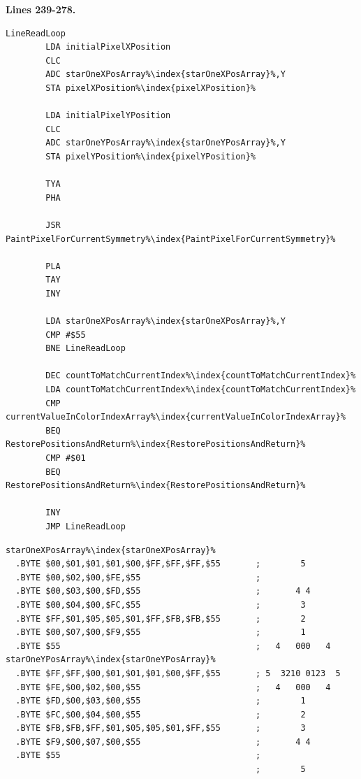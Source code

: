 \clearpage
\textbf{Lines 239-278. }
\begin{lstlisting}[caption=The core pattern-painting loop.,escapechar=\%]
LineReadLoop   
        LDA initialPixelXPosition
        CLC 
        ADC starOneXPosArray%\index{starOneXPosArray}%,Y
        STA pixelXPosition%\index{pixelXPosition}%

        LDA initialPixelYPosition
        CLC 
        ADC starOneYPosArray%\index{starOneYPosArray}%,Y
        STA pixelYPosition%\index{pixelYPosition}%

        TYA 
        PHA 

        JSR PaintPixelForCurrentSymmetry%\index{PaintPixelForCurrentSymmetry}%

        PLA 
        TAY 
        INY 

        LDA starOneXPosArray%\index{starOneXPosArray}%,Y
        CMP #$55
        BNE LineReadLoop

        DEC countToMatchCurrentIndex%\index{countToMatchCurrentIndex}%
        LDA countToMatchCurrentIndex%\index{countToMatchCurrentIndex}%
        CMP currentValueInColorIndexArray%\index{currentValueInColorIndexArray}%
        BEQ RestorePositionsAndReturn%\index{RestorePositionsAndReturn}%
        CMP #$01
        BEQ RestorePositionsAndReturn%\index{RestorePositionsAndReturn}%

        INY 
        JMP LineReadLoop

\end{lstlisting}
\begin{lstlisting}[basicstyle=\tiny,escapechar=\%]
starOneXPosArray%\index{starOneXPosArray}%
  .BYTE $00,$01,$01,$01,$00,$FF,$FF,$FF,$55       ;        5       
  .BYTE $00,$02,$00,$FE,$55                       ;                
  .BYTE $00,$03,$00,$FD,$55                       ;       4 4      
  .BYTE $00,$04,$00,$FC,$55                       ;        3       
  .BYTE $FF,$01,$05,$05,$01,$FF,$FB,$FB,$55       ;        2       
  .BYTE $00,$07,$00,$F9,$55                       ;        1       
  .BYTE $55                                       ;   4   000   4  
starOneYPosArray%\index{starOneYPosArray}%
  .BYTE $FF,$FF,$00,$01,$01,$01,$00,$FF,$55       ; 5  3210 0123  5
  .BYTE $FE,$00,$02,$00,$55                       ;   4   000   4  
  .BYTE $FD,$00,$03,$00,$55                       ;        1       
  .BYTE $FC,$00,$04,$00,$55                       ;        2       
  .BYTE $FB,$FB,$FF,$01,$05,$05,$01,$FF,$55       ;        3       
  .BYTE $F9,$00,$07,$00,$55                       ;       4 4      
  .BYTE $55                                       ;                
                                                  ;        5       
\end{lstlisting}
\clearpage

